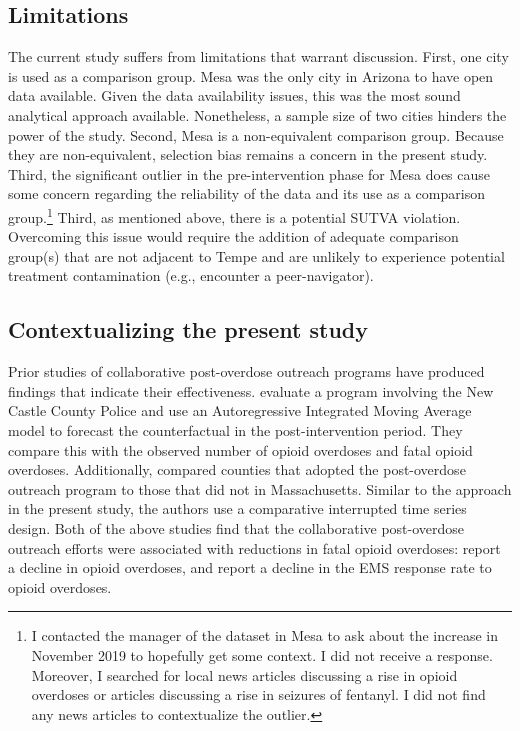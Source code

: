 \subsection{Limitations}
The current study suffers from limitations that warrant discussion. First, one city is used as a comparison group. Mesa was the only city in Arizona to have open data available. Given the data availability issues, this was the most sound analytical approach available. Nonetheless, a sample size of two cities hinders the power of the study. Second, Mesa is a non-equivalent comparison group. Because they are non-equivalent, selection bias remains a concern in the present study. Third, the significant outlier in the pre-intervention phase for Mesa does cause some concern regarding the reliability of the data and its use as a comparison group.\footnote{I contacted the manager of the dataset in Mesa to ask about the increase in November 2019 to hopefully get some context. I did not receive a response. Moreover, I searched for local news articles discussing a rise in opioid overdoses or articles discussing a rise in seizures of fentanyl. I did not find any news articles to contextualize the outlier.} Third, as mentioned above, there is a potential SUTVA violation. Overcoming this issue would require the addition of adequate comparison group(s) that are not adjacent to Tempe and are unlikely to experience potential treatment contamination (e.g., encounter a peer-navigator).

\subsection{Contextualizing the present study}

Prior studies of collaborative post-overdose outreach programs have produced findings that indicate their effectiveness. \textcite{donnelly_law_2022} evaluate a program involving the New Castle County Police and use an Autoregressive Integrated Moving Average model to forecast the counterfactual in the post-intervention period. They compare this with the observed number of opioid overdoses and fatal opioid overdoses. Additionally, \textcite{xuan_association_2023} compared counties that adopted the post-overdose outreach program to those that did not in Massachusetts. Similar to the approach in the present study, the authors use a comparative interrupted time series design. Both of the above studies find that the collaborative post-overdose outreach efforts were associated with reductions in fatal opioid overdoses: \textcite{donnelly_law_2022} report a decline in opioid overdoses, and \textcite{xuan_association_2023} report a decline in the EMS response rate to opioid overdoses. 

